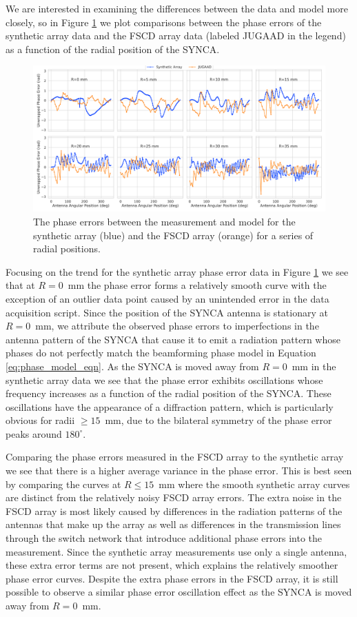 We are interested in examining the differences between the data and model more closely, so in Figure \ref{fig:phase-error-curve-comp} we plot comparisons between the phase errors of the synthetic array data and the FSCD array data (labeled JUGAAD in the legend) as a function of the radial position of the SYNCA.
\begin{figure}[htbp]
    \centering
    \includegraphics[width=1\textwidth]{figs/Chapter-5/230414_synthetic_array_phase_error_curves_z0.png}
    \caption{The phase errors between the measurement and model for the synthetic array (blue) and the FSCD array (orange) for a series of radial positions. }
    \label{fig:phase-error-curve-comp}
\end{figure}
Focusing on the trend for the synthetic array phase error data in Figure \ref{fig:phase-error-curve-comp} we see that at $R=0$~mm the phase error forms a relatively smooth curve with the exception of an outlier data point caused by an unintended error in the data acquisition script. Since the position of the SYNCA antenna is stationary at $R=0$~mm, we attribute the observed phase errors to imperfections in the antenna pattern of the SYNCA that cause it to emit a radiation pattern whose phases do not perfectly match the beamforming phase model in Equation \ref{eq:phase_model_eqn}. As the SYNCA is moved away from $R=0$~mm in the synthetic array data we see that the phase error exhibits oscillations whose frequency increases as a function of the radial position of the SYNCA. These oscillations have the appearance of a diffraction pattern, which is particularly obvious for radii $\geq15$~mm, due to the bilateral symmetry of the phase error peaks around $180^\circ$. 

Comparing the phase errors measured in the FSCD array to the synthetic array we see that there is a higher average variance in the phase error. This is best seen by comparing the curves at $R\leq15$~mm where the smooth synthetic array curves are distinct from the relatively noisy FSCD array errors. The extra noise in the FSCD array is most likely caused by differences in the radiation patterns of the antennas that make up the array as well as differences in the transmission lines through the switch network that introduce additional phase errors into the measurement. Since the synthetic array measurements use only a single antenna, these extra error terms are not present, which explains the relatively smoother phase error curves. Despite the extra phase errors in the FSCD array, it is still possible to observe a similar phase error oscillation effect as the SYNCA is moved away from $R=0$~mm.

